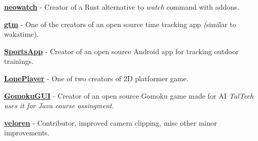 \documentclass[letterpaper]{deedy-resume} %
\begin{document}
\begin{minipage}[t]{0.66\textwidth}
\begin{tightitemize}
  \item \textbf{\href{https://github.com/kilpkonn/neowatch}{neowatch}} - Creator of a Rust alternative to \textit{watch} command with addons.
  \item \textbf{\href{https://github.com/DEVELOPEST}{gtm}} - One of the creators of an open source time tracking app \textit(similar to wakatime).
  \item \textbf{\href{https://github.com/kilpkonn/SportsApp}{SportsApp}} - Creator of an open source Android app for tracking outdoor trainings.
  \item \textbf{\href{https://github.com/kilpkonn/LonePlayer}{LonePlayer}} - One of two creators of 2D platformer game.
  \item \textbf{\href{https://github.com/kilpkonn/GomokuGUI}{GomokuGUI}} - Creator of an open source Gomoku game made for AI \textit{TalTech uses it for Java course assingment}.
  \item \textbf{\href{https://veloren.net/}{veloren}} - Contributor, improved camera clipping, misc other minor improvements.
\end{tightitemize}

\sectionspace %



%
%


%
%


\end{minipage}
\end{document}
